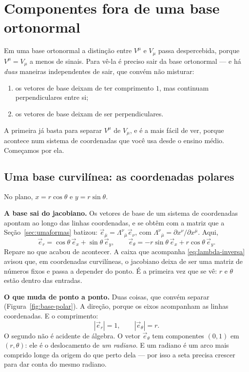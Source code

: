 \documentclass[12pt,a4paper,oneside]{book}
\theoremstyle{rgplain}
\theoremstyle{rgremark}
\begin{document}
\section{Componentes fora de uma base ortonormal}
\label{sec:base-obliqua}

Em uma base ortonormal a distinção entre $V^\mu$ e $V_\mu$ passa despercebida,
porque $V^\mu=V_\mu$ a menos de sinais. Para vê-la é preciso sair da base
ortonormal --- e há \emph{duas} maneiras independentes de sair, que convém não
misturar:

\begin{enumerate}
  \item os vetores de base deixam de ter comprimento $1$, mas continuam
  perpendiculares entre si;
  \item os vetores de base deixam de ser perpendiculares.
\end{enumerate}

A primeira já basta para separar $V^\mu$ de $V_\mu$, e é a mais fácil de ver,
porque acontece num sistema de coordenadas que você usa desde o ensino médio.
Começamos por ela.

\subsection{Uma base curvilínea: as coordenadas polares}
\label{sec:base-polar}

No plano, $x=r\cos\theta$ e $y=r\sin\theta$.

\textbf{A base sai do jacobiano.} Os vetores de base de um sistema de
coordenadas apontam ao longo das linhas coordenadas, e se obtêm com a matriz
que a Seção~\ref{sec:umaformas} batizou: $\vec e_{\bar\mu}=\Lambda^{\nu}{}_{\bar\mu}
\vec e_\nu$, com $\Lambda^{\nu}{}_{\bar\mu}=\partial x^\nu/\partial x^{\bar\mu}$.
Aqui,
\[
  \vec e_r=\cos\theta\,\vec e_x+\sin\theta\,\vec e_y,
  \qquad
  \vec e_\theta=-r\sin\theta\,\vec e_x+r\cos\theta\,\vec e_y .
\]
Repare no que acabou de acontecer. A caixa que acompanha
\eqref{eq:lambda-inversa} avisou que, em coordenadas curvilíneas, o jacobiano
deixa de ser uma matriz de números fixos e passa a depender do ponto. É a
primeira vez que se vê: $r$ e $\theta$ estão dentro das entradas.

\textbf{O que muda de ponto a ponto.} Duas coisas, que convém separar
(Figura~\ref{fig:base-polar}). A direção, porque os eixos acompanham as linhas
coordenadas. E o comprimento:
\[
  |\vec e_r|=1,\qquad |\vec e_\theta|=r .
\]
O segundo não é acidente de álgebra. O vetor $\vec e_\theta$ tem componentes
$(0,1)$ em $(r,\theta)$: ele é o deslocamento de \emph{um radiano}. E um
radiano é um arco mais comprido longe da origem do que perto dela --- por isso
a seta precisa crescer para dar conta do mesmo radiano.
\end{document}
